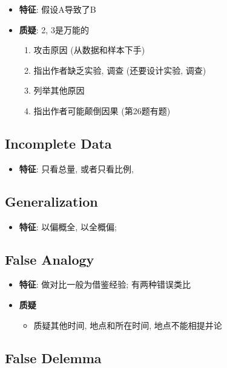     \begin{itemize}
      \item \textbf{特征}: 假设A导致了B
      \item \textbf{质疑}: 2, 3是万能的
      \begin{enumerate}
        \item 攻击原因 (从数据和样本下手)
        \item 指出作者缺乏实验, 调查 (还要设计实验, 调查)
        \item 列举其他原因
        \item 指出作者可能颠倒因果 (第26题有题)
      \end{enumerate}
    \end{itemize}

  \subsection{Incomplete Data}

    \begin{itemize}
      \item \textbf{特征}: 只看总量, 或者只看比例, 
    \end{itemize}

  \subsection{Generalization}

    \begin{itemize}
      \item \textbf{特征}: 以偏概全, 以全概偏;
    \end{itemize}

  \subsection{False Analogy}

    \begin{itemize}
      \item \textbf{特征}: 做对比一般为借鉴经验; 有两种错误类比
      \item \textbf{质疑}
      \begin{itemize}
        \item 质疑其他时间, 地点和所在时间, 地点不能相提并论
      \end{itemize}
    \end{itemize}

  \subsection{False Delemma}


